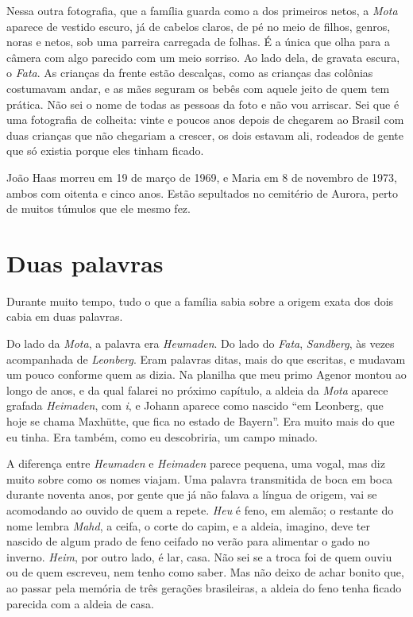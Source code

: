 \documentclass[
  brazilian,
  11pt,
  openany]{book}
\begin{document}
Nessa outra fotografia, que a família guarda como a dos primeiros netos,
a \emph{Mota} aparece de vestido escuro, já de cabelos claros, de pé no
meio de filhos, genros, noras e netos, sob uma parreira carregada de
folhas. É a única que olha para a câmera com algo parecido com um meio
sorriso. Ao lado dela, de gravata escura, o \emph{Fata}. As crianças da
frente estão descalças, como as crianças das colônias costumavam andar,
e as mães seguram os bebês com aquele jeito de quem tem prática. Não sei
o nome de todas as pessoas da foto e não vou arriscar. Sei que é uma
fotografia de colheita: vinte e poucos anos depois de chegarem ao Brasil
com duas crianças que não chegariam a crescer, os dois estavam ali,
rodeados de gente que só existia porque eles tinham ficado.

João Haas morreu em 19 de março de 1969, e Maria em 8 de novembro de
1973, ambos com oitenta e cinco anos. Estão sepultados no cemitério de
Aurora, perto de muitos túmulos que ele mesmo fez.

\section{Duas palavras}\label{duas-palavras}

Durante muito tempo, tudo o que a família sabia sobre a origem exata dos
dois cabia em duas palavras.

Do lado da \emph{Mota}, a palavra era \emph{Heumaden}. Do lado do
\emph{Fata}, \emph{Sandberg}, às vezes acompanhada de \emph{Leonberg}.
Eram palavras ditas, mais do que escritas, e mudavam um pouco conforme
quem as dizia. Na planilha que meu primo Agenor montou ao longo de anos,
e da qual falarei no próximo capítulo, a aldeia da \emph{Mota} aparece
grafada \emph{Heimaden}, com \emph{i}, e Johann aparece como nascido
``em Leonberg, que hoje se chama Maxhütte, que fica no estado de
Bayern''. Era muito mais do que eu tinha. Era também, como eu
descobriria, um campo minado.

A diferença entre \emph{Heumaden} e \emph{Heimaden} parece pequena, uma
vogal, mas diz muito sobre como os nomes viajam. Uma palavra transmitida
de boca em boca durante noventa anos, por gente que já não falava a
língua de origem, vai se acomodando ao ouvido de quem a repete.
\emph{Heu} é feno, em alemão; o restante do nome lembra \emph{Mahd}, a
ceifa, o corte do capim, e a aldeia, imagino, deve ter nascido de algum
prado de feno ceifado no verão para alimentar o gado no inverno.
\emph{Heim}, por outro lado, é lar, casa. Não sei se a troca foi de quem
ouviu ou de quem escreveu, nem tenho como saber. Mas não deixo de achar
bonito que, ao passar pela memória de três gerações brasileiras, a
aldeia do feno tenha ficado parecida com a aldeia de casa.
\end{document}
